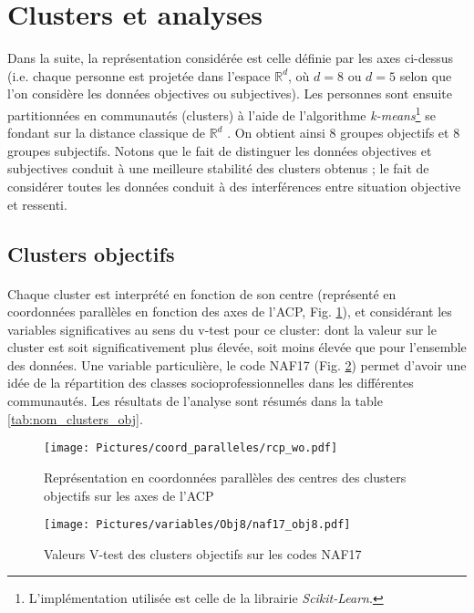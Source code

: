 \documentclass[11pt,fleqn,a4paper,openany,frenchb]{book} %
\begin{document}
\section{Clusters et analyses}

Dans la suite, la représentation considérée est celle définie par les axes ci-dessus (i.e. chaque personne est projetée dans l'espace $\mathbb{R}^d$, où $d=8$ ou $d=5$ selon que l'on considère les données objectives ou subjectives). Les personnes sont ensuite partitionnées en communautés (clusters) à l'aide de l'algorithme \textit{k-means}\footnote{L'implémentation utilisée est celle de la librairie \textit{Scikit-Learn}.} se fondant sur la distance classique de $\mathbb{R}^d$ \cite{arthur2007k}.  On obtient ainsi 8 groupes objectifs et 8 groupes subjectifs. Notons que le fait de distinguer les données objectives et subjectives conduit à une meilleure stabilité des clusters obtenus ; le fait de considérer toutes les données conduit à des interférences entre situation objective et ressenti. 

\subsection{Clusters objectifs}
\paragraph{}
Chaque cluster est interprété en fonction de son centre (représenté en coordonnées parallèles en fonction des  axes de l'ACP, Fig. \ref{fig:CPobj}), et considérant les variables significatives au sens du v-test pour ce cluster: dont la valeur sur le cluster est soit significativement plus élevée, soit moins élevée que pour l'ensemble des données. Une variable particulière, le code NAF17 (Fig. \ref{fig:nafobj}) permet d'avoir une idée de la répartition des classes socioprofessionnelles dans les différentes communautés. Les résultats de l'analyse sont résumés dans la table \ref{tab:nom_clusters_obj}.


\begin{figure}[!h]
\centering
  \texttt{[image: Pictures/coord\_paralleles/rcp\_wo.pdf]}
\caption{Représentation en coordonnées parallèles des centres des clusters objectifs sur les axes de l'ACP}
\label{fig:CPobj}
\end{figure}

\begin{figure}[!h]
\centering
  \texttt{[image: Pictures/variables/Obj8/naf17\_obj8.pdf]}
\caption{Valeurs V-test des clusters objectifs sur les codes NAF17}
\label{fig:nafobj}
\end{figure}
\end{document}
